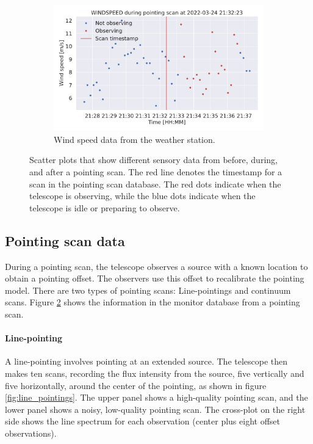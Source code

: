 \begin{figure}[H]
\begin{subfigure}[t]{0.49\textwidth}
        \centering
        \includegraphics[width=\textwidth]{Feature during scans/scan_WINDSPEED_335.pdf}
        \caption{Wind speed data from the weather station.}
        \label{subfig:scan_windspeed}
    \end{subfigure}
     \caption{Scatter plots that show different sensory data from before, during, and after a pointing scan. The red line denotes the timestamp for a scan in the pointing scan database.
     The red dots indicate when the telescope is observing, while the blue dots indicate when the telescope is idle or preparing to observe.}
     \label{fig:features_during_scans}
\end{figure}


\subsection{Pointing scan data}
During a pointing scan, the telescope observes a source with a known location to obtain a pointing offset.
The observers use this offset to recalibrate the pointing model. There are two types of pointing scans: Line-pointings and continuum scans.
Figure \ref{fig:features_during_scans} shows the information in the monitor database from a pointing scan.

\paragraph{Line-pointing}
A line-pointing involves pointing at an extended source. 
The telescope then makes ten scans, recording the flux intensity from the source, five vertically and five horizontally,
around the center of the pointing, as shown in figure \ref{fig:line_pointings}.
The upper panel shows a high-quality pointing scan, and the lower panel shows a noisy, low-quality pointing scan.
The cross-plot on the right side shows the line spectrum for each observation (center plus eight offset observations).

